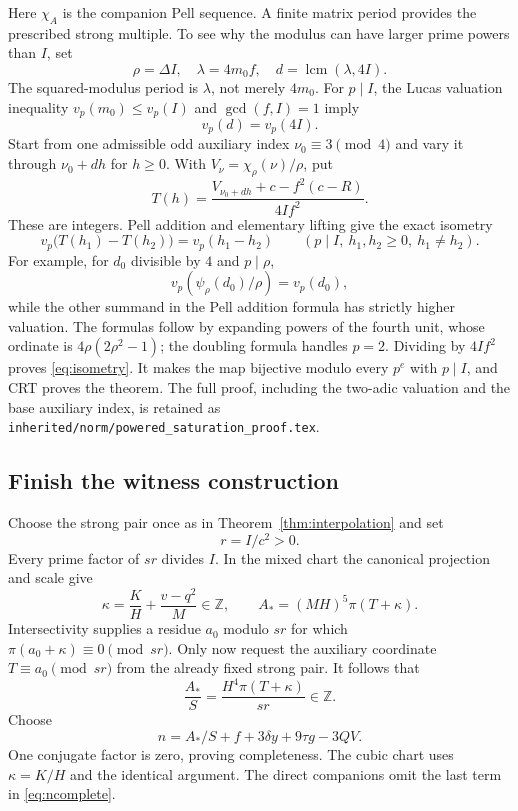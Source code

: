 \documentclass[11pt]{article}
\newcommand{\Z}{\mathbb Z}
\theoremstyle{definition}
\theoremstyle{remark}
\begin{document}
Here $\chi_A$ is the companion Pell sequence. A finite matrix period
provides the prescribed strong multiple. To see why the modulus can
have larger prime powers than $I$, set
\[
 \rho=\Delta I,\quad \lambda=4m_0f,
 \quad d=\operatorname{lcm}(\lambda,4I).
\]
The squared-modulus period is $\lambda$, not merely $4m_0$.
For $p\mid I$, the Lucas valuation inequality
$v_p(m_0)\le v_p(I)$ and $\gcd(f,I)=1$ imply
\[
 v_p(d)=v_p(4I).
\]
Start from one admissible odd auxiliary index $\nu_0\equiv3\pmod4$
and vary it through $\nu_0+dh$ for $h\ge0$. With
$V_\nu=\chi_\rho(\nu)/\rho$, put
\[
 T(h)=\frac{V_{\nu_0+dh}+c-f^2(c-R)}{4If^2}.
\]
These are integers. Pell addition and elementary lifting give the
exact isometry
\begin{equation}\label{eq:isometry}
 v_p\bigl(T(h_1)-T(h_2)\bigr)=v_p(h_1-h_2)
 \qquad(p\mid I,\ h_1,h_2\ge0,\ h_1\ne h_2).
\end{equation}
For example, for $d_0$ divisible by $4$ and $p\mid\rho$,
\[
 v_p\left(\psi_\rho(d_0)/\rho\right)=v_p(d_0),
\]
while the other summand in the Pell addition formula has strictly
higher valuation. The formulas follow by expanding powers of the
fourth unit, whose ordinate is $4\rho(2\rho^2-1)$; the doubling
formula handles $p=2$. Dividing by $4If^2$ proves
\eqref{eq:isometry}. It makes the map bijective modulo every $p^e$
with $p\mid I$, and CRT proves the theorem. The full proof,
including the two-adic valuation and the base auxiliary index, is
retained as \texttt{inherited/norm/powered\_saturation\_proof.tex}.

\subsection{Finish the witness construction}
Choose the strong pair once as in Theorem~\ref{thm:interpolation} and
set
\[
 r=I/c^2>0.
\]
Every prime factor of $sr$ divides $I$. In the mixed chart the
canonical projection and scale give
\[
 \kappa=\frac K H+\frac{v-q^2}{M}\in\Z,
 \qquad A_*=(MH)^5\pi(T+\kappa).
\]
Intersectivity supplies a residue $a_0$ modulo $sr$ for which
$\pi(a_0+\kappa)\equiv0\pmod{sr}$. Only now request the auxiliary
coordinate $T\equiv a_0\pmod{sr}$ from the already fixed strong
pair. It follows that
\[
 \frac{A_*}{S}=\frac{H^4\pi(T+\kappa)}{sr}\in\Z.
\]
Choose
\begin{equation}\label{eq:ncomplete}
 n=A_*/S+f+3\delta y+9\tau g-3QV.
\end{equation}
One conjugate factor is zero, proving completeness. The cubic chart
uses $\kappa=K/H$ and the identical argument. The direct companions
omit the last term in \eqref{eq:ncomplete}.
\end{document}
